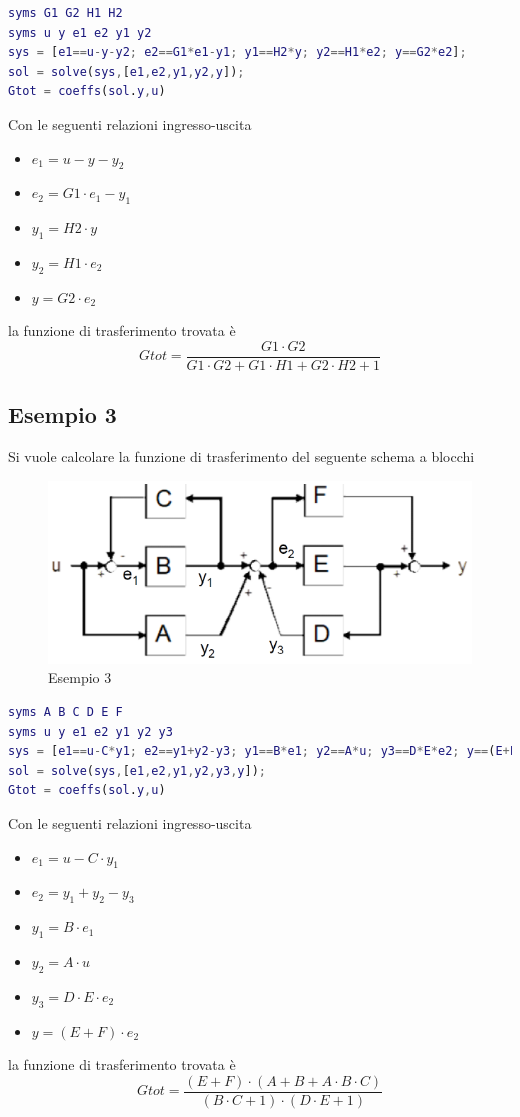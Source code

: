 \documentclass[a4paper,oneside,titlepage]{book}
\begin{document}
\begin{lstlisting}[language=Matlab, caption=Esempio 2 in Matlab]
syms G1 G2 H1 H2
syms u y e1 e2 y1 y2
sys = [e1==u-y-y2; e2==G1*e1-y1; y1==H2*y; y2==H1*e2; y==G2*e2];
sol = solve(sys,[e1,e2,y1,y2,y]);
Gtot = coeffs(sol.y,u)
\end{lstlisting}
Con le seguenti relazioni ingresso-uscita
\begin{itemize}
\item $e_1 = u - y - y_2$
\item $e_2 = G1 \cdot e_1 - y_1$
\item $y_1 = H2 \cdot y$
\item $y_2 = H1 \cdot e_2$
\item $y = G2 \cdot e_2$
\end{itemize}
la funzione di trasferimento trovata è
\[ Gtot = \frac{G1 \cdot G2}{G1 \cdot G2 + G1 \cdot H1 + G2 \cdot H2 + 1} \]

\subsection{Esempio 3}
Si vuole calcolare la funzione di trasferimento del seguente schema a blocchi
\begin{figure}[htp]
    \centering
    \includegraphics[scale=.5]{blocchi3.PNG}
    \caption{Esempio 3}
    \label{fig:blocchi3}
\end{figure}

\begin{lstlisting}[language=Matlab, caption=Esempio 3 in Matlab]
syms A B C D E F
syms u y e1 e2 y1 y2 y3
sys = [e1==u-C*y1; e2==y1+y2-y3; y1==B*e1; y2==A*u; y3==D*E*e2; y==(E+F)*e2];
sol = solve(sys,[e1,e2,y1,y2,y3,y]);
Gtot = coeffs(sol.y,u)
\end{lstlisting}
Con le seguenti relazioni ingresso-uscita
\begin{itemize}
\item $e_1 = u - C \cdot y_1$
\item $e_2 = y_1 + y_2 - y_3$
\item $y_1 = B \cdot e_1$
\item $y_2 = A \cdot u$
\item $y_3 = D \cdot E \cdot e_2$
\item $y = (E+F) \cdot e_2$
\end{itemize}
la funzione di trasferimento trovata è
\[ Gtot = \frac{(E + F) \cdot (A + B + A \cdot B \cdot C)}{(B \cdot C + 1) \cdot (D \cdot E + 1)} \]
\end{document}
